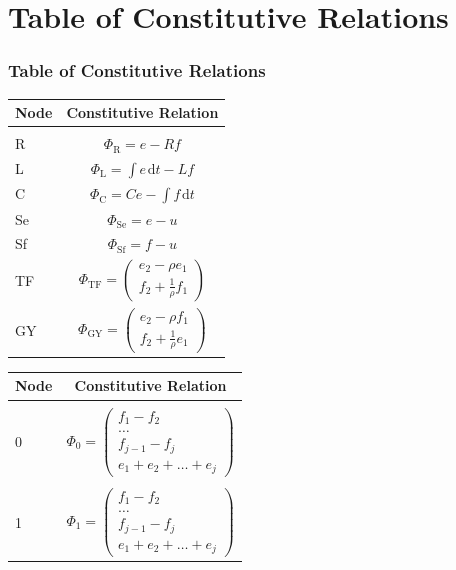 \documentclass[11pt,reqno]{beamer}
\newcommand{\df}[1]{\mspace{2mu}  \mathrm{d}#1}
\begin{document}
\section{Table of Constitutive Relations}
\begin{frame}
\frametitle{Table of Constitutive Relations}
\begin{small}
\begin{minipage}[c][\textheight][t]{0.4\textwidth}

\vspace{0.75cm}
\begin{tabular}{| l | c |}
	Node & Constitutive Relation\\
	\hline
	& \\
	R & $\Phi_\text{R} = e -Rf$\\
	L & $\Phi_\text{L} = \int e\df{t} - Lf$\\
	C & $\Phi_\text{C} = Ce - \int f \df{t}$\\
	Se & $\Phi_\text{Se} = e - u$\\
	Sf & $\Phi_\text{Sf} = f - u$\\
	TF & $\Phi_\text{TF} =\left(\begin{matrix}
	e_2 - \rho e_1 \\
	f_2 +\frac{1}{\rho}f_1
	\end{matrix} \right)$\\
	GY & $\Phi_\text{GY} =\left(\begin{matrix}
	e_2 - \rho f_1 \\
	f_2 +\frac{1}{\rho}e_1
	\end{matrix} \right)$
\end{tabular}
\end{minipage}\hfill
\begin{minipage}[c][\textheight][t]{0.45\textwidth}
	\vspace{1cm}
\begin{tabular}{| l | c |}
	Node & Constitutive Relation\\
	\hline
	&\\
	0 &$	\Phi_\text{0} = \left(\begin{matrix}
	f_1 -f_2\\
	\ldots\\
	f_{j-1} - f_j\\
	e_1 + e_2 + \ldots + e_j 
	\end{matrix}\right)$\\
	&
	\\
	1&$	\Phi_\text{1} = \left(\begin{matrix}
	f_1 -f_2\\
	\ldots\\
	f_{j-1} - f_j\\
	e_1 + e_2 + \ldots + e_j 
	\end{matrix}\right)$
\end{tabular}
\end{minipage}
\end{small}

\end{frame}



\begin{thebibliography}{1}
 \end{thebibliography}
\end{document}
